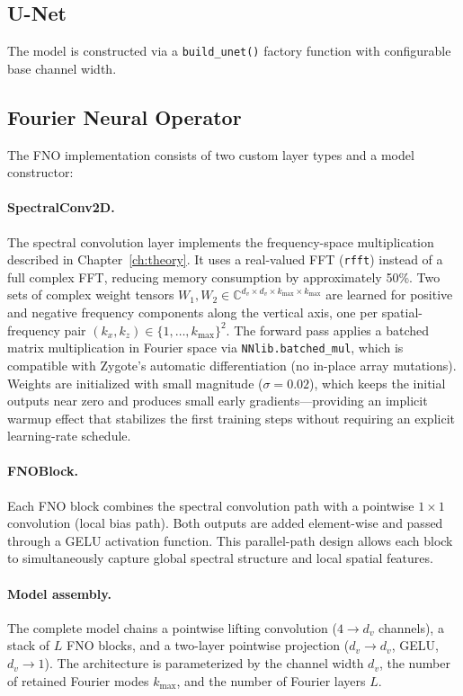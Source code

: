 \subsection*{U-Net}

The model is constructed via a \texttt{build\_unet()} factory function with configurable base channel width.

\subsection*{Fourier Neural Operator}

The FNO implementation consists of two custom layer types and a model constructor:

\paragraph{SpectralConv2D.}
The spectral convolution layer implements the frequency-space multiplication described in Chapter~\ref{ch:theory}. It uses a real-valued FFT (\texttt{rfft}) instead of a full complex FFT, reducing memory consumption by
approximately 50\%. Two sets of complex weight tensors $W_1, W_2 \in \mathbb{C}^{d_v \times d_v \times k_{\max} \times k_{\max}}$ are learned for positive and negative frequency components along the vertical axis, one per spatial-frequency pair $(k_x, k_z) \in \{1,\ldots,k_{\max}\}^2$. The forward pass applies a batched matrix multiplication in Fourier space via \texttt{NNlib.batched\_mul}, which is compatible with Zygote's automatic differentiation (no in-place array mutations). Weights are initialized with small magnitude ($\sigma = 0.02$), which keeps the initial outputs near zero and produces small early gradients—providing an implicit warmup effect that stabilizes the first training steps without requiring an explicit learning-rate schedule.

\paragraph{FNOBlock.}
Each FNO block combines the spectral convolution path with a pointwise $1\times1$ convolution (local bias path). Both outputs are added element-wise and passed through a GELU activation function. This parallel-path design
allows each block to simultaneously capture global spectral structure and local spatial features.

\paragraph{Model assembly.}
The complete model chains a pointwise lifting convolution ($4 \to d_v$ channels), a stack of $L$ FNO blocks, and a two-layer pointwise projection ($d_v \to d_v$, GELU, $d_v \to 1$). The architecture is parameterized by the channel width $d_v$, the number of retained Fourier modes $k_{\max}$, and the number of Fourier layers $L$.

